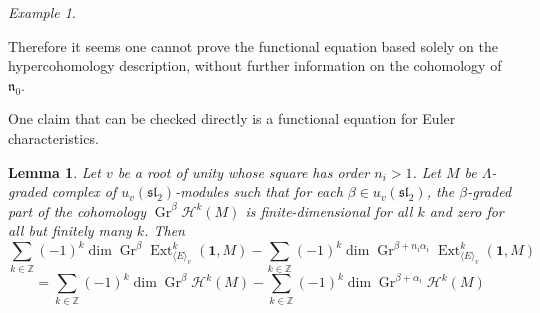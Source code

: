 \documentclass[11pt,letterpaper]{article}
\newtheorem{lemma}[theorem]{Lemma}
\theoremstyle{definition}
\theoremstyle{remark}
\newtheorem{example}[theorem]{Example}
\numberwithin{equation}{section}
\theoremstyle{dotless}
\newcommand{\Gr}{\operatorname{Gr}}
\newcommand{\qv}{v}
\newcommand{\Ext}{\operatorname{Ext}}
\begin{document}
\begin{example}

\end{example}





Therefore it seems one cannot prove the functional equation based solely on the hypercohomology description, without further information on the cohomology of $\mathfrak n_0$.


One claim that can be checked directly is a functional equation for Euler characteristics.

 


\begin{lemma}\label{Euler-comparison}Let $\qv$ be a root of unity whose square has order $n_i>1$. Let $M$ be $\Lambda$-graded complex of $u_{\qv}(\mathfrak{sl}_2)$-modules such that for each $\beta \in u_{\qv}(\mathfrak{sl}_2)$, the $\beta$-graded part of the cohomology $\Gr^\beta \mathcal H^k(M) $ is finite-dimensional for all $k$ and zero for all but finitely many $k$. Then
\[ \sum_{k \in \mathbb Z} (-1)^k \dim \Gr^\beta \Ext^k_{\langle E \rangle_{\qv}} (\mathbf 1, M ) - \sum_{k \in \mathbb Z} (-1)^k \dim \Gr^{\beta+n_i\alpha_i} \Ext^k_{\langle E \rangle_{\qv}} (\mathbf 1, M )  \] \[= \sum_{k \in \mathbb Z} (-1)^k \dim \Gr^\beta  \mathcal H^k (M)  - \sum_{k\in \mathbb Z} (-1)^k \dim \Gr^{\beta+\alpha_i} \mathcal H^k (M) \]
\end{lemma}
\end{document}
